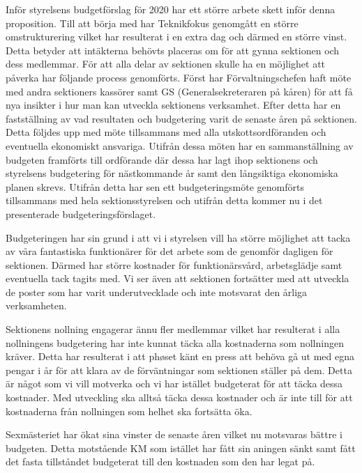 \documentclass[../_main/handlingar.tex]{subfiles}
\begin{document}

Inför styrelsens budgetförslag för 2020 har ett större arbete skett inför denna proposition.
Till att börja med har Teknikfokus genomgått en större omstrukturering vilket har resulterat i en extra dag och därmed en större vinst. Detta betyder att intäkterna behövts placeras om för att gynna sektionen och dess medlemmar.
För att alla delar av sektionen skulle ha en möjlighet att påverka har följande process genomförts.
Först har Förvaltningschefen haft möte med andra sektioners kassörer samt GS (Generalsekreteraren på kåren) för att få nya insikter i hur man kan utveckla sektionens verksamhet. 
Efter detta har en fastställning av vad resultaten och budgetering varit de senaste åren på sektionen. 
Detta följdes upp med möte tillsammans med alla utskottsordföranden och eventuella ekonomiskt ansvariga. Utifrån dessa möten har en sammanställning av budgeten framförts till ordförande där dessa har lagt ihop sektionens och styrelsens budgetering för nästkommande år samt den långsiktiga ekonomiska planen skrevs. 
Utifrån detta har sen ett budgeteringsmöte genomförts tillsammans med hela sektionsstyrelsen och utifrån detta kommer nu i det presenterade budgeteringsförslaget.

Budgeteringen har sin grund i att vi i styrelsen vill ha större möjlighet att tacka av våra fantastiska funktionärer för det arbete som de genomför dagligen för sektionen. Därmed har större kostnader för funktionärsvård, arbetsglädje samt eventuella tack tagits med.
Vi ser även att sektionen fortsätter med att utveckla de poster som har varit underutvecklade och inte motsvarat den årliga verksamheten.

Sektionens nollning engagerar ännu fler medlemmar vilket har resulterat i alla nollningens budgetering har inte kunnat täcka alla kostnaderna som nollningen kräver. Detta har resulterat i att phøset känt en press att behöva gå ut med egna pengar i år för att klara av de förväntningar som sektionen ställer på dem. Detta är något som vi vill motverka och vi har istället budgeterat för att täcka dessa kostnader. Med utveckling ska alltså täcka dessa kostnader och är inte till för att kostnaderna från nollningen som helhet ska fortsätta öka.

Sexmästeriet har ökat sina vinster de senaste åren vilket nu motsvaras bättre i budgeten. Detta motstående KM som istället har fått sin aningen sänkt samt fått det fasta tillståndet budgeterat till den kostnaden som den har legat på.
\end{document}
